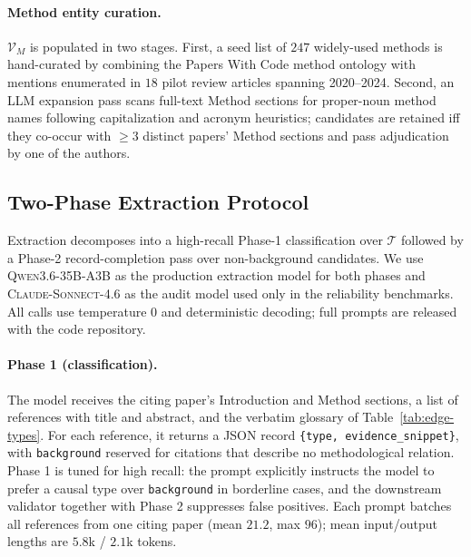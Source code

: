 \documentclass{llmxive}
\begin{document}
\paragraph{Method entity curation.}
$\mathcal{V}_M$ is populated in two stages. First, a seed list of $247$ widely-used methods is hand-curated by
combining the Papers With Code method ontology with mentions enumerated in $18$ pilot review articles spanning
2020--2024. Second, an LLM expansion pass scans full-text Method sections for proper-noun method names following
capitalization and acronym heuristics; candidates are retained iff they co-occur with $\ge 3$ distinct papers'
Method sections and pass adjudication by one of the authors.


\subsection{Two-Phase Extraction Protocol}
\label{app:extraction}

Extraction decomposes into a high-recall Phase-1 classification over $\mathcal{T}$ followed by a Phase-2
record-completion pass over non-background candidates. We use \textsc{Qwen3.6-35B-A3B} as the production
extraction model for both phases and \textsc{Claude-Sonnect-4.6} as the audit model used only in the reliability
benchmarks. All calls use temperature $0$ and deterministic decoding; full prompts are released with the code
repository.

\paragraph{Phase 1 (classification).}
The model receives the citing paper's Introduction and Method sections, a list of references with title and
abstract, and the verbatim glossary of Table~\ref{tab:edge-types}. For each reference, it returns a JSON record
\texttt{\{type, evidence\_snippet\}}, with \texttt{background} reserved for citations that describe no
methodological relation. Phase 1 is tuned for high recall: the prompt explicitly instructs the model to prefer a
causal type over \texttt{background} in borderline cases, and the downstream validator together with Phase 2
suppresses false positives. Each prompt batches all references from one citing paper (mean $21.2$, max $96$); mean
input/output lengths are $5.8$k / $2.1$k tokens.
\end{document}
